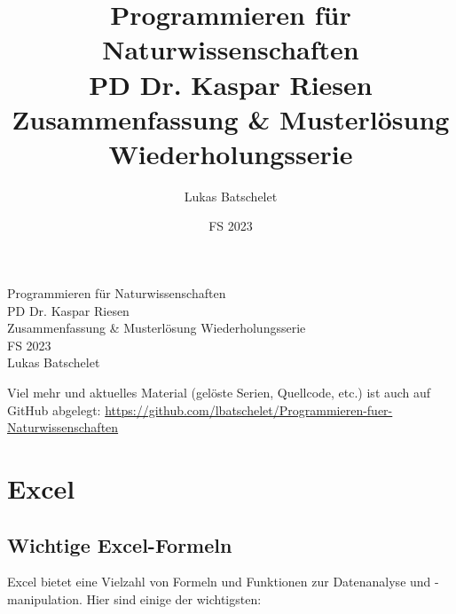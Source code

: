 \documentclass[11pt, oneside]{book}
\title{\sffamily Programmieren für Naturwissenschaften\\ \large PD Dr. Kaspar Riesen\\ \LARGE Zusammenfassung \& Musterlösung Wiederholungsserie}
\author{\sffamily Lukas Batschelet}
\date{\sffamily FS 2023}
\newcommand{\github}[1]{%
   \href{#1}{\faGithubSquare}%
}
\begin{document}
\begin{titlepage}
    \begin{center}
        {\LARGE Programmieren für Naturwissenschaften}\\[0.5cm]
        {\large PD Dr. Kaspar Riesen}\\[0.3cm]
        {\LARGE Zusammenfassung \& Musterlösung Wiederholungsserie}\\[0.5cm]
        {\large FS 2023}\\[2cm]
        {\large Lukas Batschelet}\\[0.3cm]
    \end{center}
    \vfill %
    \noindent \github{https://github.com/lbatschelet/Programmieren-fuer-Naturwissenschaften} Viel mehr und aktuelles Material (gelöste Serien, Quellcode, etc.) ist auch auf GitHub abgelegt:
    \href{https://github.com/lbatschelet/Programmieren-fuer-Naturwissenschaften}{https://github.com/lbatschelet/Programmieren-fuer-Naturwissenschaften}
    \doclicenseThis
\end{titlepage}

\tableofcontents

\chapter{Excel}

\section{Wichtige Excel-Formeln}

Excel bietet eine Vielzahl von Formeln und Funktionen zur Datenanalyse und -manipulation. Hier sind einige der wichtigsten:
\end{document}
